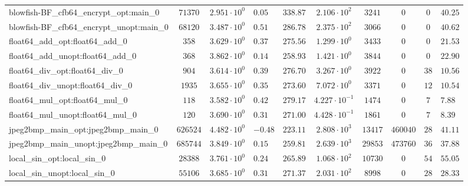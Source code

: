 \begin{tabular}{|l|c|HHc|c|c|c|cH|}
blowfish-BF\_cfb64\_encrypt\_opt:main\_0        & $ 71370    $ & $ 2.951 \cdot 10^{0} $ & $ 0.05  $ & $ 338.87 $ & $ 2.106 \cdot 10^{2}  $ & $ 3241   $ & $ 0       $ & $ 0   $ & $ 40.25   $ \\
blowfish-BF\_cfb64\_encrypt\_unopt:main\_0      & $ 68120    $ & $ 3.487 \cdot 10^{0} $ & $ 0.51  $ & $ 286.78 $ & $ 2.375 \cdot 10^{2}  $ & $ 3066   $ & $ 0       $ & $ 0   $ & $ 40.62   $ \\
float64\_add\_opt:float64\_add\_0               & $ 358      $ & $ 3.629 \cdot 10^{0} $ & $ 0.37  $ & $ 275.56 $ & $ 1.299 \cdot 10^{0}  $ & $ 3433   $ & $ 0       $ & $ 0   $ & $ 21.53   $ \\
float64\_add\_unopt:float64\_add\_0             & $ 368      $ & $ 3.862 \cdot 10^{0} $ & $ 0.14  $ & $ 258.93 $ & $ 1.421 \cdot 10^{0}  $ & $ 3844   $ & $ 0       $ & $ 0   $ & $ 22.90   $ \\
float64\_div\_opt:float64\_div\_0               & $ 904      $ & $ 3.614 \cdot 10^{0} $ & $ 0.39  $ & $ 276.70 $ & $ 3.267 \cdot 10^{0}  $ & $ 3922   $ & $ 0       $ & $ 38  $ & $ 10.56   $ \\
float64\_div\_unopt:float64\_div\_0             & $ 1935     $ & $ 3.655 \cdot 10^{0} $ & $ 0.35  $ & $ 273.60 $ & $ 7.072 \cdot 10^{0}  $ & $ 3371   $ & $ 0       $ & $ 12  $ & $ 10.54   $ \\
float64\_mul\_opt:float64\_mul\_0               & $ 118      $ & $ 3.582 \cdot 10^{0} $ & $ 0.42  $ & $ 279.17 $ & $ 4.227 \cdot 10^{-1} $ & $ 1474   $ & $ 0       $ & $ 7   $ & $ 7.88    $ \\
float64\_mul\_unopt:float64\_mul\_0             & $ 120      $ & $ 3.690 \cdot 10^{0} $ & $ 0.31  $ & $ 271.00 $ & $ 4.428 \cdot 10^{-1} $ & $ 1861   $ & $ 0       $ & $ 7   $ & $ 8.39    $ \\
jpeg2bmp\_main\_opt:jpeg2bmp\_main\_0           & $ 626524   $ & $ 4.482 \cdot 10^{0} $ & $ -0.48 $ & $ 223.11 $ & $ 2.808 \cdot 10^{3}  $ & $ 13417  $ & $ 460040  $ & $ 28  $ & $ 41.11   $ \\
jpeg2bmp\_main\_unopt:jpeg2bmp\_main\_0         & $ 685744   $ & $ 3.849 \cdot 10^{0} $ & $ 0.15  $ & $ 259.81 $ & $ 2.639 \cdot 10^{3}  $ & $ 29853  $ & $ 473760  $ & $ 36  $ & $ 37.88   $ \\
local\_sin\_opt:local\_sin\_0                   & $ 28388    $ & $ 3.761 \cdot 10^{0} $ & $ 0.24  $ & $ 265.89 $ & $ 1.068 \cdot 10^{2}  $ & $ 10730  $ & $ 0       $ & $ 54  $ & $ 55.05   $ \\
local\_sin\_unopt:local\_sin\_0                 & $ 55106    $ & $ 3.685 \cdot 10^{0} $ & $ 0.31  $ & $ 271.37 $ & $ 2.031 \cdot 10^{2}  $ & $ 8998   $ & $ 0       $ & $ 28  $ & $ 28.33   $ \\

\end{tabular}
